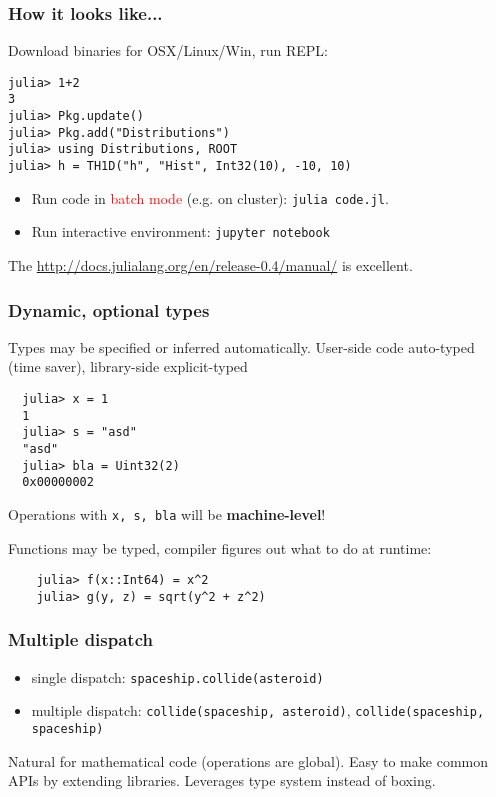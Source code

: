 \documentclass[16pt]{beamer}
\begin{document}
\begin{frame}[fragile]
  \frametitle{How it looks like...}
  Download binaries for OSX/Linux/Win, run REPL:
  \begin{lstlisting}
julia> 1+2
3
julia> Pkg.update()
julia> Pkg.add("Distributions")
julia> using Distributions, ROOT
julia> h = TH1D("h", "Hist", Int32(10), -10, 10)
  \end{lstlisting}
  \begin{itemize}
    \item Run code in \textcolor{red}{batch mode} (e.g. on cluster): \texttt{julia code.jl}.
    \item Run interactive environment: \texttt{jupyter notebook} 
  \end{itemize}

  The \href{manual}{http://docs.julialang.org/en/release-0.4/manual/} is excellent.
\end{frame}


\begin{frame}[fragile]
  \frametitle{Dynamic, optional types}

  \begin{centering}

  Types may be specified or inferred automatically.
  User-side code auto-typed (time saver), library-side explicit-typed
  \begin{lstlisting}
  julia> x = 1
  1
  julia> s = "asd"
  "asd"
  julia> bla = Uint32(2)
  0x00000002
  \end{lstlisting}
  Operations with \texttt{x, s, bla} will be \textbf{machine-level}!

  Functions may be typed, compiler figures out what to do at runtime:
  \begin{lstlisting}
    julia> f(x::Int64) = x^2
    julia> g(y, z) = sqrt(y^2 + z^2)
  \end{lstlisting}
  \end{centering}
\end{frame}

\begin{frame}[fragile]
  \frametitle{Multiple dispatch}
  \begin{itemize}
  \item single dispatch: \verb|spaceship.collide(asteroid)|
  \item multiple dispatch: \verb|collide(spaceship, asteroid)|, \verb|collide(spaceship, spaceship)|
  \end{itemize}

  Natural for mathematical code (operations are global). Easy to make common APIs by extending libraries. Leverages type system instead of boxing.
  \begin{centering}
  \end{centering}
\end{frame}
\end{document}
